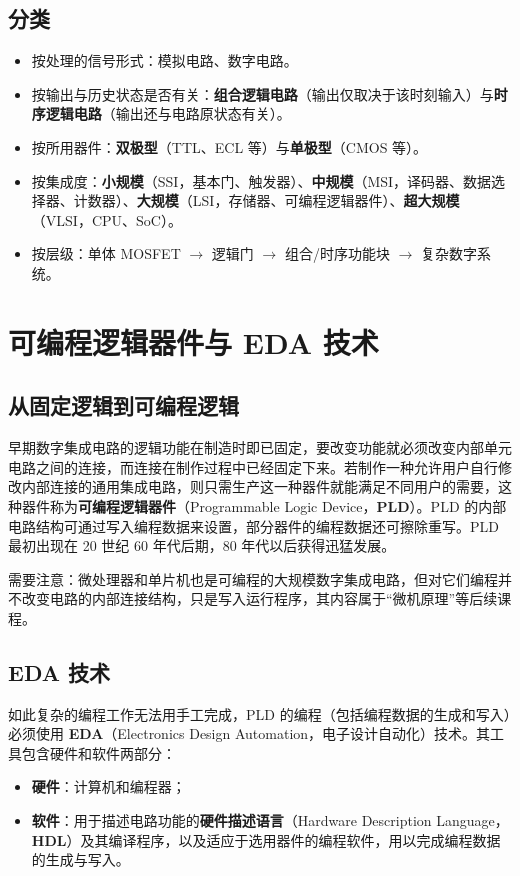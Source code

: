 \subsection{分类}
\begin{itemize}
    \item 按处理的信号形式：模拟电路、数字电路。
    \item 按输出与历史状态是否有关：\textbf{组合逻辑电路}（输出仅取决于该时刻输入）与\textbf{时序逻辑电路}（输出还与电路原状态有关）。
    \item 按所用器件：\textbf{双极型}（TTL、ECL 等）与\textbf{单极型}（CMOS 等）。
    \item 按集成度：\textbf{小规模}（SSI，基本门、触发器）、\textbf{中规模}（MSI，译码器、数据选择器、计数器）、\textbf{大规模}（LSI，存储器、可编程逻辑器件）、\textbf{超大规模}（VLSI，CPU、SoC）。
    \item 按层级：单体 MOSFET $\rightarrow$ 逻辑门 $\rightarrow$ 组合/时序功能块 $\rightarrow$ 复杂数字系统。
\end{itemize}

\section{可编程逻辑器件与 EDA 技术}
\subsection{从固定逻辑到可编程逻辑}
早期数字集成电路的逻辑功能在制造时即已固定，要改变功能就必须改变内部单元电路之间的连接，而连接在制作过程中已经固定下来。若制作一种允许用户自行修改内部连接的通用集成电路，则只需生产这一种器件就能满足不同用户的需要，这种器件称为\textbf{可编程逻辑器件}（Programmable Logic Device，\textbf{PLD}）。PLD 的内部电路结构可通过写入编程数据来设置，部分器件的编程数据还可擦除重写。PLD 最初出现在 20 世纪 60 年代后期，80 年代以后获得迅猛发展。

需要注意：微处理器和单片机也是可编程的大规模数字集成电路，但对它们编程并不改变电路的内部连接结构，只是写入运行程序，其内容属于``微机原理''等后续课程。

\subsection{EDA 技术}
如此复杂的编程工作无法用手工完成，PLD 的编程（包括编程数据的生成和写入）必须使用 \textbf{EDA}（Electronics Design Automation，电子设计自动化）技术。其工具包含硬件和软件两部分：
\begin{itemize}
    \item \textbf{硬件}：计算机和编程器；
    \item \textbf{软件}：用于描述电路功能的\textbf{硬件描述语言}（Hardware Description Language，\textbf{HDL}）及其编译程序，以及适应于选用器件的编程软件，用以完成编程数据的生成与写入。
\end{itemize}


